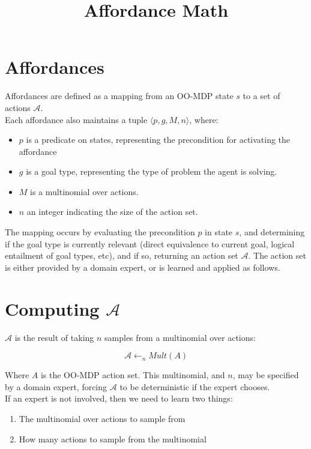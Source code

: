 \documentclass[11pt]{article}
\title{Affordance Math}
\date{}
\begin{document}
\maketitle

\section{Affordances}
Affordances are defined as a mapping from an OO-MDP state $s$ to a set of actions $\mathcal{A}$. \\

Each affordance also maintains a tuple $\langle p, g, M, n\rangle$, where:

\begin{itemize}
\item $p$ is a predicate on states, representing the precondition for activating the affordance
\item $g$ is a goal type, representing the type of problem the agent is solving.
\item $M$ is a multinomial over actions.
\item $n$ an integer indicating the size of the action set.
\end{itemize}

The mapping occurs by evaluating the precondition $p$ in state $s$, and determining if the goal type
is currently relevant (direct equivalence to current goal, logical entailment of goal types, etc), and if so,
returning an action set $\mathcal{A}$. The action set is either provided by a domain expert, or is learned and applied as follows. \\

\section{Computing $\mathcal{A}$}
$\mathcal{A}$ is the result of taking $n$ samples from a multinomial over actions:

\begin{equation}
\mathcal{A} \leftarrow_n Mult(A)
\end{equation}

Where $A$ is the OO-MDP action set. This multinomial, and $n$, may be specified by a domain expert, forcing $\mathcal{A}$ to be deterministic if the expert chooses. \\

If an expert is not involved, then we need to learn two things:
\begin{enumerate}
\item The multinomial over actions to sample from
\item How many actions to sample from the multinomial
\end{enumerate}
\end{document}
